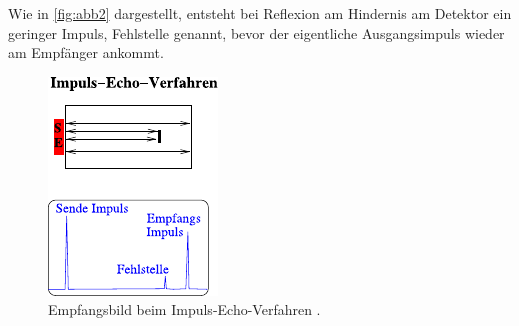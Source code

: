 Wie in \autoref{fig:abb2} dargestellt, entsteht bei Reflexion am Hindernis am Detektor ein geringer
Impuls, Fehlstelle genannt, bevor der eigentliche Ausgangsimpuls
wieder am Empfänger ankommt.

\begin{figure}
    \centering
    \includegraphics{figures/abb2.pdf}
    \caption{Empfangsbild beim Impuls-Echo-Verfahren \cite{ap06}.}
    \label{fig:abb2}
\end{figure}


